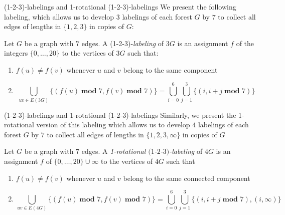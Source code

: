 \documentclass[xcolor=x11names,compress,8pt]{beamer}
\theoremstyle{plain}
\begin{document}
    \begin{frame}{(1-2-3)-labelings and 1-rotational (1-2-3)-labelings}
        We present the following labeling, which allows us to develop $3$ labelings of each forest $G$ by $7$ to collect all edges of lengths in $\{1,2,3\}$ in copies of $G$:
        \begin{definition}\label{def:123}
            Let $G$ be a graph with $7$ edges. A (1-2-3)-\emph{labeling} of $3G$ is an assignment $f$ of the integers $\{0,\dots,20\}$ to the vertices of $3G$ such that:
            \begin{enumerate}
                \item $f(u) \neq f(v)$ whenever $u$ and $v$ belong to the same component
                \item $$\bigcup_{uv\in E(3G)} \{(f(u)\; \textbf{mod } 7,f(v)\; \textbf{mod } 7)\}= \bigcup_{i=0}^{6} \bigcup_{j=1}^{3} \{(i,i+j \; \textbf{mod } 7)\}$$
            \end{enumerate}
        \end{definition}

    \end{frame}

    \begin{frame}{(1-2-3)-labelings and 1-rotational (1-2-3)-labelings}
        Similarly, we present the 1-rotational version of this labeling which allows us to develop $4$ labelings of each forest $G$ by $7$ to collect all edges of lengths in $\{1,2,3,\infty\}$ in copies of $G$
        \begin{definition}\label{def:123_1-rot}
            Let $G$ be a graph with $7$ edges. A \emph{1-rotational $(1$-$2$-$3)$-labeling} of $4G$ is an assignment $f$ of $\{0,\dots,20\} \cup \infty$ to the vertices of $4G$ such that
            \begin{enumerate}
                \item $f(u) \neq f(v)$ whenever $u$ and $v$ belong to the same connected component
                \item  $$ \bigcup_{uv\in E(4G)} \{(f(u)\; \textbf{mod } 7,f(v)\; \textbf{mod } 7)\}= \bigcup_{i=0}^{6} \bigcup_{j=1}^{3} \{(i,i+j \; \textbf{mod } 7), (i,\infty)\}$$
            \end{enumerate}
        \end{definition}

    \end{frame}
\end{document}
